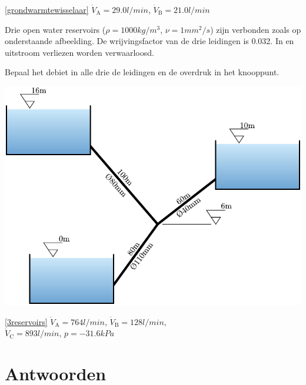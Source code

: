\begin{antwoord}{\ref{grondwarmtewisselaar}}
	$\dot{V}_\mathrm{A} = 29.0\unit{l/min}$, $\dot{V}_\mathrm{B} = 21.0\unit{l/min}$
\end{antwoord}
\begin{toepassing}[*]
	\label{3reservoirs}
Drie open water reservoirs ($\rho=1000\unit{kg/m^3}$, $\nu=1\unit{mm^2/s}$) zijn verbonden zoals op onderstaande afbeelding. De wrijvingsfactor van de drie leidingen is 0.032. In en uitstroom verliezen worden verwaarloosd.
		
Bepaal het debiet in alle drie de leidingen en de overdruk in het knooppunt.
		
	\centering
	\includegraphics{fig/leidingstelsels/3reservoirs}
\end{toepassing}
\begin{antwoord}{\ref{3reservoirs}}
		$\dot{V}_\mathrm{A} = 764\unit{l/min}$, $\dot{V}_\mathrm{B} = 128\unit{l/min}$,\\
		$\dot{V}_\mathrm{C} = 893\unit{l/min}$, $p=-31.6\unit{kPa}$
\end{antwoord}
\section*{Antwoorden}
	\begin{multicols}{2}
	\end{multicols}